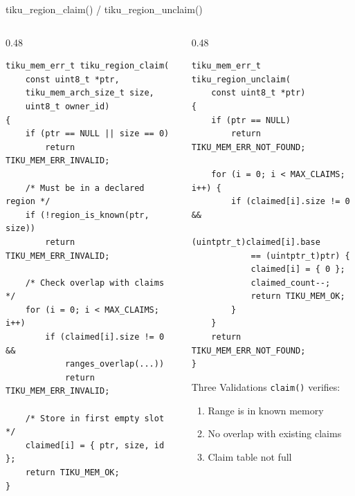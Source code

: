 \documentclass[aspectratio=169, 10pt]{beamer}
\begin{document}
\begin{frame}[fragile]{tiku\_region\_claim() / tiku\_region\_unclaim()}
\begin{columns}[T]
\begin{column}{0.48\textwidth}
\begin{lstlisting}[style=cstyle, title={Claim --- register ownership}]
tiku_mem_err_t tiku_region_claim(
    const uint8_t *ptr,
    tiku_mem_arch_size_t size,
    uint8_t owner_id)
{
    if (ptr == NULL || size == 0)
        return TIKU_MEM_ERR_INVALID;

    /* Must be in a declared region */
    if (!region_is_known(ptr, size))
        return TIKU_MEM_ERR_INVALID;

    /* Check overlap with claims */
    for (i = 0; i < MAX_CLAIMS; i++)
        if (claimed[i].size != 0 &&
            ranges_overlap(...))
            return TIKU_MEM_ERR_INVALID;

    /* Store in first empty slot */
    claimed[i] = { ptr, size, id };
    return TIKU_MEM_OK;
}
\end{lstlisting}
\end{column}

\begin{column}{0.48\textwidth}
\begin{lstlisting}[style=cstyle, title={Unclaim --- release ownership}]
tiku_mem_err_t tiku_region_unclaim(
    const uint8_t *ptr)
{
    if (ptr == NULL)
        return TIKU_MEM_ERR_NOT_FOUND;

    for (i = 0; i < MAX_CLAIMS; i++) {
        if (claimed[i].size != 0 &&
            (uintptr_t)claimed[i].base
            == (uintptr_t)ptr) {
            claimed[i] = { 0 };
            claimed_count--;
            return TIKU_MEM_OK;
        }
    }
    return TIKU_MEM_ERR_NOT_FOUND;
}
\end{lstlisting}

\vspace{0.3em}
\begin{block}{Three Validations}
\texttt{claim()} verifies:
\begin{enumerate}
  \item Range is in known memory
  \item No overlap with existing claims
  \item Claim table not full
\end{enumerate}
\end{block}
\end{column}
\end{columns}
\end{frame}
\end{document}

